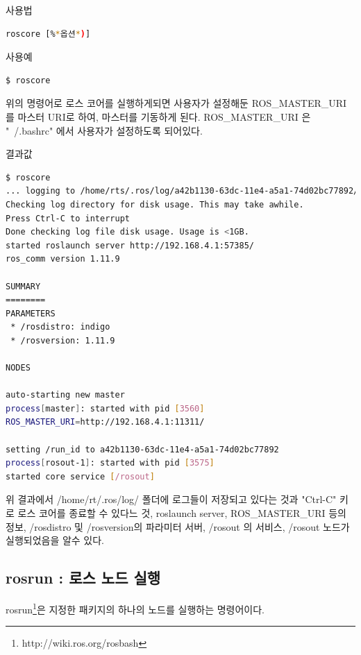 \vspace{\baselineskip}
\noindent
{}\circled{\thenum} 사용법
\begin{lstlisting}[language=bash]
roscore [%*옵션*)]
\end{lstlisting}

\noindent
{}\circled{\thenum} 사용예
\begin{lstlisting}[language=bash]
$ roscore
\end{lstlisting}

\noindent
위의 명령어로 로스 코어를 실행하게되면 사용자가 설정해둔 ROS\_MASTER\_URI 를 마스터 URI로 하여, 마스터를 기동하게 된다. ROS\_MASTER\_URI 은 "~/.bashrc" 에서 사용자가 설정하도록 되어있다.

\vspace{\baselineskip}
\noindent
{}\circled{\thenum} 결과값
\begin{lstlisting}[language=bash]
$ roscore
... logging to /home/rts/.ros/log/a42b1130-63dc-11e4-a5a1-74d02bc77892/roslaunch-rts-3547.log
Checking log directory for disk usage. This may take awhile.
Press Ctrl-C to interrupt
Done checking log file disk usage. Usage is <1GB.
started roslaunch server http://192.168.4.1:57385/
ros_comm version 1.11.9

SUMMARY
========
PARAMETERS
 * /rosdistro: indigo
 * /rosversion: 1.11.9

NODES

auto-starting new master
process[master]: started with pid [3560]
ROS_MASTER_URI=http://192.168.4.1:11311/

setting /run_id to a42b1130-63dc-11e4-a5a1-74d02bc77892
process[rosout-1]: started with pid [3575]
started core service [/rosout]
\end{lstlisting}

\vspace{\baselineskip}
\noindent
위 결과에서 /home/rt/.ros/log/ 폴더에 로그들이 저장되고 있다는 것과 "Ctrl-C" 키로 로스 코어를 종료할 수 있다느 것, roslaunch server, ROS\_MASTER\_URI 등의 정보, /rosdistro 및 /rosversion의 파라미터 서버, /rosout 의 서비스, /rosout 노드가 실행되었음을 알수 있다.


\subsection{rosrun : 로스 노드 실행}

rosrun\footnote{http://wiki.ros.org/rosbash}은 지정한 패키지의 하나의 노드를 실행하는 명령어이다.

